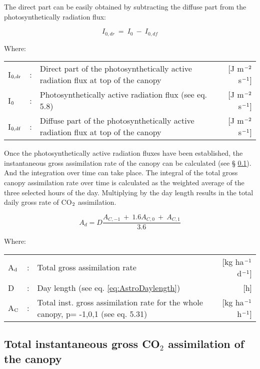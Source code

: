 The direct part can be easily obtained by subtracting the diffuse part from the
photosynthetically radiation flux:

\begin{equation}
I_{0,dr} ~=~ I_{0} ~-~I_{0,df} 
\end{equation}
 
Where:\\[5pt]
\begin{tabularx}{\textwidth}{llXr}
I$_{{\rm 0,dr}}$ &:& Direct part of the photosynthetically active radiation flux 
   at top of the canopy    &    [J m$^{{\rm -2}}$ s$^{{\rm -1}}$]\\
I$_{{\rm 0}}$ &:& Photosynthetically active radiation flux (see eq. 5.8)    &  
   [J m$^{{\rm -2}}$ s$^{{\rm -1}}$]\\
I$_{{\rm 0,df}}$ &:& Diffuse part of the photosynthetically active radiation flux 
   at top of the canopy     &   [J m$^{{\rm -2}}$ s$^{{\rm -1}}$]\\
\end{tabularx}

Once the photosynthetically active radiation fluxes have been established, the 
instantaneous gross assimilation rate of the canopy can be calculated (see \S
 \ref{sec:InstantGrossAssimilation}). And the integration over time can take place.
The integral of the total gross canopy assimilation rate over time is calculated as the
weighted average of the three selected hours of the day. Multiplying by the day length
results in the total daily gross rate of CO$_{{\rm 2}}$ assimilation. 

\begin{equation}
A_{d} = D {\frac{A_{C,-1} ~+~ 1.6 A_{C,0} ~+~ A_{C,1} }{3.6}}
\end{equation}

Where:\\[5pt]
\begin{tabularx}{\textwidth}{llXr}
A$_{{\rm d}}$ &:& Total gross assimilation rate    &    
[kg ha$^{{\rm -1}}$ d$^{{\rm -1}}$]\\
D &:& Day length (see eq. \ref{eq:AstroDaylength})   &     [h]\\
A$_{{\rm C}}$ &:& Total inst. gross assimilation rate for
   the whole canopy, p= -1,0,1 (see eq. 5.31)    &    [kg ha$^{{\rm -1}}$ h$^{{\rm -1}}$]\\
\end{tabularx}

\subsection{Total instantaneous gross CO$_{2}$ assimilation of the canopy}  
\label{sec:InstantGrossAssimilation}

